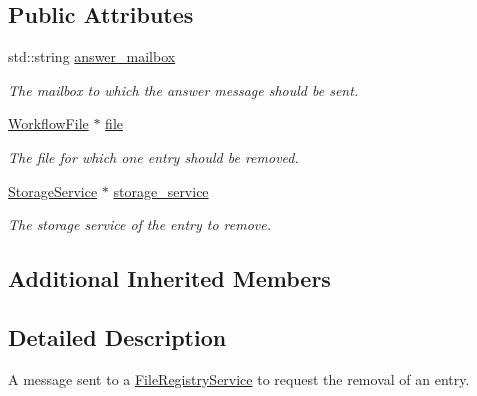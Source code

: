 \subsection*{Public Attributes}
\begin{DoxyCompactItemize}
\item 
\mbox{\label{classwrench_1_1_file_registry_remove_entry_request_message_a25d5ced262bfc6495c02f89bcb49176b}} 
std\+::string \hyperlink{classwrench_1_1_file_registry_remove_entry_request_message_a25d5ced262bfc6495c02f89bcb49176b}{answer\+\_\+mailbox}
\begin{DoxyCompactList}\small\item\em The mailbox to which the answer message should be sent. \end{DoxyCompactList}\item 
\mbox{\label{classwrench_1_1_file_registry_remove_entry_request_message_ab571fddd8f8fa14358c1a16aa987b6b7}} 
\hyperlink{classwrench_1_1_workflow_file}{Workflow\+File} $\ast$ \hyperlink{classwrench_1_1_file_registry_remove_entry_request_message_ab571fddd8f8fa14358c1a16aa987b6b7}{file}
\begin{DoxyCompactList}\small\item\em The file for which one entry should be removed. \end{DoxyCompactList}\item 
\mbox{\label{classwrench_1_1_file_registry_remove_entry_request_message_ac437e03a1616d25d8c1480953bb52b13}} 
\hyperlink{classwrench_1_1_storage_service}{Storage\+Service} $\ast$ \hyperlink{classwrench_1_1_file_registry_remove_entry_request_message_ac437e03a1616d25d8c1480953bb52b13}{storage\+\_\+service}
\begin{DoxyCompactList}\small\item\em The storage service of the entry to remove. \end{DoxyCompactList}\end{DoxyCompactItemize}
\subsection*{Additional Inherited Members}


\subsection{Detailed Description}
A message sent to a \hyperlink{classwrench_1_1_file_registry_service}{File\+Registry\+Service} to request the removal of an entry. 

